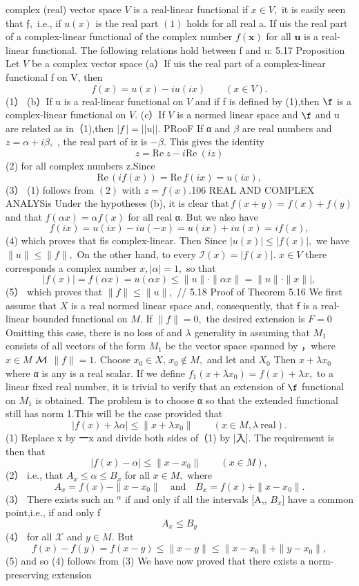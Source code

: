complex (real) vector space ${\mathbf{}}V$ is a real-linear functional if $x\in V,$ it is easily seen that ${\mathfrak{f}},$ i.e., if $u(x)$ is the real part $(1)$ holds for all real a. If uis the real part of a complex-linear functional of the complex number $f({\boldsymbol{x}})$ for all $\boldsymbol{u}$ is a real-linear functional. The following relations hold between f and u: 5.17 Proposition Let ${\mathbf{}}V$ be a complex vector space (a）If uis the real part of a complex-linear functional f on V, then $$ f(x)=u(x)-i u(i x)\qquad(x\in V). $$ (1） (b）If u is a real-linear functional on ${\mathbf{}}V$ and if f is defined by (1),then $\boldsymbol{\f}$ is a complex-linear functional on $V.$ (c）If ${\mathbf{}}V$ is a normed linear space and $\boldsymbol{\f}$ and u are related as in（1),then $|f\,|=||u||.$ PRooF If α and $\beta$ are real numbers and $z=\alpha+i\beta,$ , the real part of iz is $-\beta.$ This gives the identity $$ z=\mathrm{Re}\ z-i\mathrm{Re}\ (i z) $$ (2) for all complex numbers z.Since $$ \mathrm{Re}\,(i f(x))=\mathrm{Re}\,f(i x)=u(i x), $$ (3） (1) follows from $(2)$ with $z=f(x).$106 REAL AND COMPLEX ANALYSis Under the hypotheses (b), it is clear $\mathrm{that}\,f(x+y)=f(x)+f(y)$ and that $f(\alpha x)=\alpha f(x)$ for all real α. But we also have $$ f(i x)=u(i x)-i u(-x)=u(i x)+i u(x)=i f(x), $$ (4) which proves that fis complex-linear. Then Since $|u(x)|\leq|f(x)|,$ we have $\|u\|\leq\|f\|,$ On the other hand, to every ${\mathcal{I}}(x)=|f(x)|.$ $x\in V$ there corresponds a complex number $x,|\alpha|=1,$ so that $$ |f(x)|=f(\alpha x)=u(\alpha x)\leq\|u\|\cdot\|\alpha x\|=\|u\|\cdot\|x\||, $$ (5） which proves that $\|f\|\leq\|u\|,$ // 5.18 Proof of Theorem 5.16 We first assume that $X$ is a real normed linear space and, consequently, that $\boldsymbol{\mathsf{f}}$ is a real-linear bounded functional on $M.$ If $\|f\|=0,$ the desired extension is $\scriptstyle{F=0}$ Omitting this case, there is no loss of and $\lambda$ generality in assuming that $M_{1}$ consists of all vectors of the form $M_{1}$ be the vector space spanned by ，where $x\in M$ ${\cal{M}}$ $\|f\|=1.$ Choose $x_{0}\in X,\,x_{0}\notin M,$ and let and $\scriptstyle{X_{0}}$ Then $x+\lambda x_{0}$ where α is any is a real scalar. If we define $f_{1}(x+\lambda x_{0})=f(x)+\lambda x,$ to a linear fixed real number, it is trivial to verify that an extension of $\boldsymbol{\f}$ functional on $M_{1}$ is obtained. The problem is to choose α so that the extended functional still has norm 1.This will be the case provided that $$ |f(x)+\lambda\alpha|\leq\|x+\lambda x_{0}\|\qquad(x\in M,\lambda\ {\mathrm{real}}). $$ (1) Replace x by 一x and divide both sides of（1) by |入]. The requirement is then that $$ |f(x)-\alpha|\leq\|x-x_{0}\|\qquad(x\in M), $$ (2） i.e., that $A_{x}\leq\alpha\leq B_{x}$ for all $x\in M,$ where $$ A_{x}=f(x)-\|x-x_{0}\|\quad{\mathrm{and}}\quad B_{x}=f(x)+\|x-x_{0}\|. $$ (3） There exists such an $^{\alpha}$ if and only if all the intervals [A,, $B_{x}]$ have a common point,i.e., if and only f $$ A_{x}\leq B_{y} $$ (4） for all $\scriptstyle{\mathcal{X}}$ and $y\in M.$ But $$ f(x)-f(y)=f(x-y)\leq\|x-y\|\leq\|x-x_{0}\|+\|y-x_{0}\|, $$ (5) and so (4) follows from (3) We have now proved that there exists a norm-preserving extension 